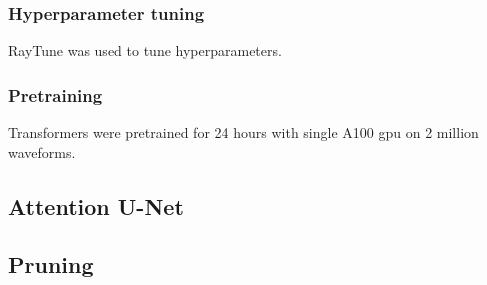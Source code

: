 \subsubsection{Hyperparameter tuning}

RayTune was used to tune hyperparameters. 

\subsubsection{Pretraining}

Transformers were pretrained for 24 hours with single A100 gpu on 2 million waveforms.


\subsection{Attention U-Net}



\subsection{Pruning}






